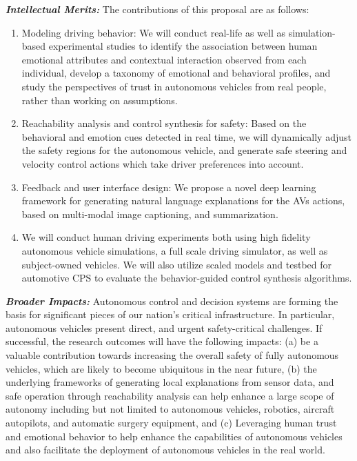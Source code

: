 \noindent\emph{\textbf{Intellectual Merits:}} The contributions of this proposal are as follows:
\begin{enumerate}[itemsep=0pt,parsep=0pt,topsep=4pt,leftmargin=0.4in]
    \item Modeling driving behavior: We will conduct real-life as well as simulation-based experimental studies to identify the association between human emotional attributes and contextual interaction observed from each individual, develop a taxonomy of emotional and behavioral profiles, and study the perspectives of trust in autonomous vehicles from real people, rather than working on assumptions.
    \item Reachability analysis and control synthesis for safety:
    Based on the behavioral and emotion cues detected in real time, we will dynamically adjust the safety regions for the autonomous vehicle, and generate safe steering and velocity control actions which take driver preferences into account.
    \item Feedback and user interface design: We propose a novel deep learning framework for generating natural language explanations for the AVs actions, based on multi-modal image captioning, and summarization.
    \item We will conduct human driving experiments both using high fidelity autonomous vehicle simulations, a full scale driving simulator, as well as subject-owned vehicles. We will also utilize scaled models and testbed for automotive CPS to evaluate the behavior-guided control synthesis algorithms.
\end{enumerate}


\noindent\emph{\textbf{Broader Impacts:}} 
Autonomous control and decision systems are forming the basis for significant pieces of our nation’s critical infrastructure. In particular, autonomous vehicles present direct, and urgent safety-critical challenges. If successful, the research outcomes will have the following impacts: (a) be a valuable contribution towards increasing the overall safety of fully autonomous vehicles, which are likely to become ubiquitous in the near future, (b) the underlying frameworks of generating local explanations from sensor data, and safe operation through reachability analysis can help enhance a large scope of autonomy including but not limited to autonomous vehicles, robotics, aircraft autopilots, and automatic surgery equipment, and (c) Leveraging human trust and emotional behavior to help enhance the capabilities of autonomous vehicles and also facilitate the deployment of autonomous vehicles in the real world. 

